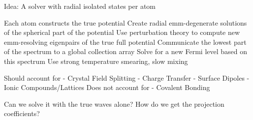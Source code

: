 Idea:
  A solver with radial isolated states per atom
  
  Each atom constructs the true potential
  Create radial emm-degenerate solutions of the spherical part of the potential
  Use perturbation theory to compute new emm-resolving eigenpairs of the true full potential
  Communicate the lowest part of the spectrum to a global collection array
  Solve for a new Fermi level based on this spectrum
  Use strong temperature smearing, slow mixing
  
  Should account for
    - Crystal Field Splitting
    - Charge Transfer
    - Surface Dipoles
    - Ionic Compounds/Lattices
  Does not account for
    - Covalent Bonding

  Can we solve it with the true waves alone?
  How do we get the projection coefficients?
